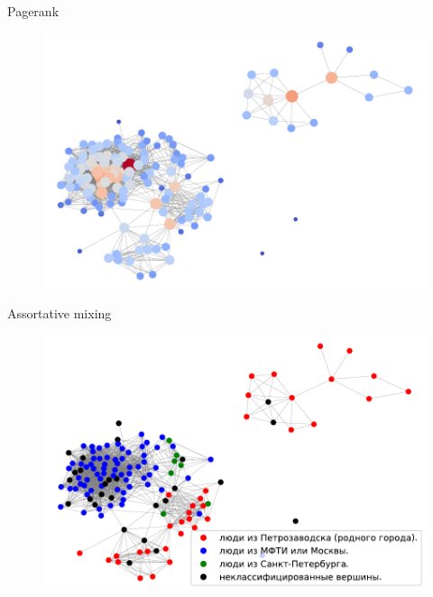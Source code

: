 \documentclass{beamer}
\begin{document}
\begin{frame} {Pagerank}
\begin{figure}[h!t]\center
\includegraphics[width=1\textwidth]{pagerank.pdf}
\label{fig6}
\end{figure}
\end{frame}

\begin{frame} {Assortative mixing}
\begin{figure}[h!t]\center
\includegraphics[width=1\textwidth]{assortative_mixing.pdf}
\label{fig7}
\end{figure}
\end{frame}
\end{document}
